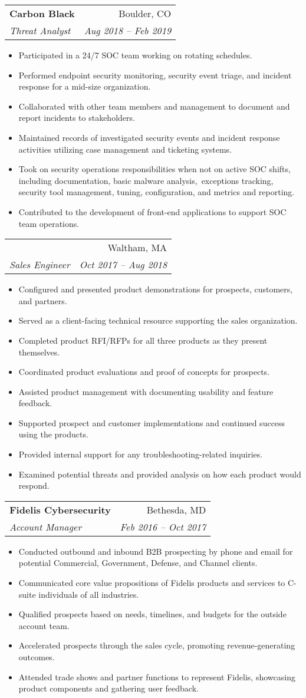 \documentclass[letterpaper,11pt]{article}
\makeatletter
\newcommand{\resumeSubheading}[4]{
  \vspace{-1pt}\item
    \begin{tabular*}{0.97\textwidth}[t]{l@{\extracolsep{\fill}}r}
      \textbf{#1} & #2 \\
      \textit{\small#3} & \textit{\small #4} \\
    \end{tabular*}\vspace{-5pt}
}
\newcommand{\resumeSubSubheading}[4]{
  \vspace{2pt}
    \begin{tabular*}{0.97\textwidth}[t]{l@{\extracolsep{\fill}}r}
      #1 & #2 \\
      \textit{\small#3} & \textit{\small#4} \\
    \end{tabular*}\vspace{-5pt}
}
\newcommand{\resumeItemListStart}{\begin{itemize}[nosep]}
\newcommand{\resumeItemListEnd}{\end{itemize}\vspace{-5pt}}
\makeatother
\begin{document}
\resumeSubheading
{Carbon Black}{Boulder, CO}
{Threat Analyst}{Aug 2018 -- Feb 2019}
\resumeItemListStart
\item Participated in a 24/7 SOC team working on rotating schedules.
\item Performed endpoint security monitoring, security event triage, and incident response for a mid-size organization.
\item Collaborated with other team members and management to document and report incidents to stakeholders.
\item Maintained records of investigated security events and incident response activities utilizing case management and ticketing systems.
\item Took on security operations responsibilities when not on active SOC shifts, including documentation, basic malware analysis,\
exceptions tracking, security tool management, tuning, configuration, and metrics and reporting.
\item Contributed to the development of front-end applications to support SOC team operations.
\resumeItemListEnd

\resumeSubSubheading
{}{Waltham, MA}
{Sales Engineer}{Oct 2017 -- Aug 2018}
\resumeItemListStart
\item Configured and presented product demonstrations for prospects, customers, and partners.
\item Served as a client-facing technical resource supporting the sales organization.
\item Completed product RFI/RFPs for all three products as they present themselves.
\item Coordinated product evaluations and proof of concepts for prospects.
\item Assisted product management with documenting usability and feature feedback.
\item Supported prospect and customer implementations and continued success using the products.
\item Provided internal support for any troubleshooting-related inquiries.
\item Examined potential threats and provided analysis on how each product would respond.
\resumeItemListEnd

\resumeSubheading
{Fidelis Cybersecurity}{Bethesda, MD}
{Account Manager}{Feb 2016 -- Oct 2017}
\resumeItemListStart
\item Conducted outbound and inbound B2B prospecting by phone and email for potential Commercial, Government, Defense, and Channel clients.
\item Communicated core value propositions of Fidelis products and services to C-suite individuals of all industries.
\item Qualified prospects based on needs, timelines, and budgets for the outside account team.
\item Accelerated prospects through the sales cycle, promoting revenue-generating outcomes.
\item Attended trade shows and partner functions to represent Fidelis, showcasing product components and gathering user feedback.
\resumeItemListEnd
\end{document}
